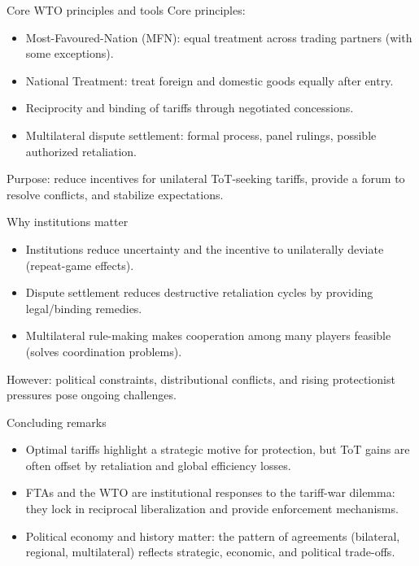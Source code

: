 \documentclass[notes,11pt, aspectratio=169, xcolor=table]{beamer}
\begin{document}
\begin{frame}{Core WTO principles and tools}
  Core principles:
  \begin{itemize}
    \item Most-Favoured-Nation (MFN): equal treatment across trading partners (with some exceptions).
    \item National Treatment: treat foreign and domestic goods equally after entry.
    \item Reciprocity and binding of tariffs through negotiated concessions.
    \item Multilateral dispute settlement: formal process, panel rulings, possible authorized retaliation.
  \end{itemize}
  Purpose: reduce incentives for unilateral ToT-seeking tariffs, provide a forum to resolve conflicts, and stabilize expectations.
\end{frame}

\begin{frame}{Why institutions matter}
  \begin{itemize}
    \item Institutions reduce uncertainty and the incentive to unilaterally deviate (repeat-game effects).
    \item Dispute settlement reduces destructive retaliation cycles by providing legal/binding remedies.
    \item Multilateral rule-making makes cooperation among many players feasible (solves coordination problems).
  \end{itemize}
  However: political constraints, distributional conflicts, and rising protectionist pressures pose ongoing challenges.
\end{frame}

\begin{frame}{Concluding remarks}
  \begin{itemize}
    \item Optimal tariffs highlight a strategic motive for protection, but ToT gains are often offset by retaliation and global efficiency losses.
    \item FTAs and the WTO are institutional responses to the tariff-war dilemma: they lock in reciprocal liberalization and provide enforcement mechanisms.
    \item Political economy and history matter: the pattern of agreements (bilateral, regional, multilateral) reflects strategic, economic, and political trade-offs.
  \end{itemize}
\end{frame}
\end{document}
